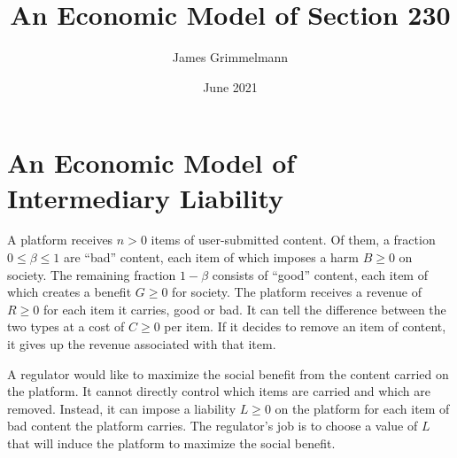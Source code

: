 \documentclass[openbib,12pt]{article}  %
\title{An Economic Model of Section 230}
\author{James Grimmelmann}
\date{June 2021}
\begin{document}
\maketitle

\section{An Economic Model of Intermediary Liability}

A platform receives $n > 0$ items of user-submitted content. Of them, a fraction $0 \le \beta \le 1$  are ``bad'' content, each item of which imposes a harm $B \ge 0$ on society. The remaining fraction $1 - \beta$ consists of ``good'' content, each item of which creates a benefit $G \ge 0$ for society. The platform receives a revenue of $R \ge 0$ for each item it carries, good or bad. It can tell the difference between the two types at a cost of $C \ge 0$ per item. If it decides to remove an item of content, it gives up the revenue associated with that item.

A regulator would like to maximize the social benefit from the content carried on the platform. It cannot directly control which items are carried and which are removed. Instead, it can impose a liability $L \ge 0$ on the platform for each item of bad content the platform carries. The regulator's job is to choose a value of $L$ that will induce the platform to maximize the social benefit.
\end{document}
